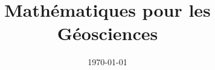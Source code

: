\documentclass[a4,11pt]{book}
\begin{document}
\title{\vspace{-2cm}
\bf{Mathématiques pour les Géosciences} }
\date{\today}
\maketitle 
\thispagestyle{empty}


\hfill
\hfill



\tableofcontents

\hfill
\hfill  

\newpage












\nocite{*}

\printbibliography
%
%
\end{document}

